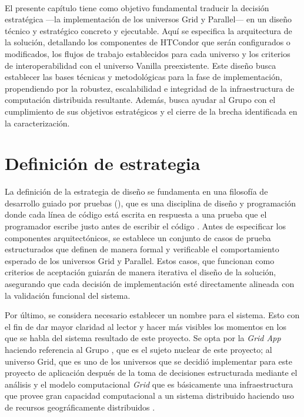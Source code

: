 \label{cap:disenio}
\mbox{}\\

El presente capítulo tiene como objetivo fundamental traducir la decisión estratégica —la implementación de los universos Grid y Parallel— en un diseño técnico y estratégico concreto y ejecutable. Aquí se especifica la arquitectura de la solución, detallando los componentes de HTCondor que serán configurados o modificados, los flujos de trabajo establecidos para cada universo y los criterios de interoperabilidad con el universo Vanilla preexistente. Este diseño busca establecer las bases técnicas y metodológicas para la fase de implementación, propendiendo por la robustez, escalabilidad e integridad de la infraestructura de computación distribuida resultante. Además, busca ayudar al Grupo \GRID con el cumplimiento de sus objetivos estratégicos y el cierre de la brecha identificada en la caracterización.

\section{Definición de estrategia}
\noindent
La definición de la estrategia de diseño se fundamenta en una filosofía de desarrollo guiado por pruebas (\TDD), que es una disciplina de diseño y programación donde cada línea de código está escrita en respuesta a una prueba que el programador escribe justo antes de escribir el código \citep{4163024}. Antes de especificar los componentes arquitectónicos, se establece un conjunto de casos de prueba estructurados que definen de manera formal y verificable el comportamiento esperado de los universos Grid y Parallel. Estos casos, que funcionan como criterios de aceptación guiarán de manera iterativa el diseño de la solución, asegurando que cada decisión de implementación esté directamente alineada con la validación funcional del sistema.

Por último, se considera necesario establecer un nombre para el sistema. Esto con el fin de dar mayor claridad al lector y hacer más visibles los momentos en los que se habla del sistema resultado de este proyecto. Se opta por la \textit{Grid App} haciendo referencia al Grupo \GRID, que es el sujeto nuclear de este proyecto; al universo Grid, que es uno de los universos que se decidió implementar para este proyecto de aplicación después de la toma de decisiones estructurada mediante el análisis \DAR y el modelo computacional \textit{Grid} que es básicamente una infraestructura que provee gran capacidad computacional a un sistema distribuido haciendo uso de recursos geográficamente distribuidos \citep{8974490}.

